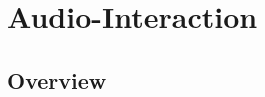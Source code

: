 \documentclass{llmxive}
\begin{document}
\section{Audio-Interaction}
\vspace{-2mm}
\subsection{Overview}
\vspace{-2mm}
\end{document}
